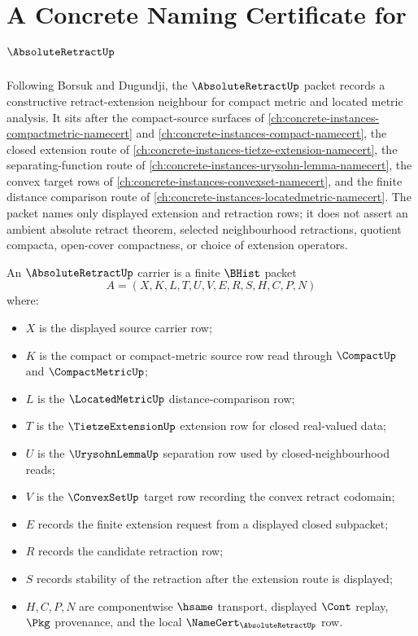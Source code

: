 \chapter{A Concrete Naming Certificate for $\AbsoluteRetractUp$}
\label{ch:concrete-instances-absolute-retract-namecert}

Following Borsuk and Dugundji, the $\AbsoluteRetractUp$ packet records a constructive retract-extension neighbour for compact metric and located metric analysis. It sits after the compact-source surfaces of \autoref{ch:concrete-instances-compactmetric-namecert} and \autoref{ch:concrete-instances-compact-namecert}, the closed extension route of \autoref{ch:concrete-instances-tietze-extension-namecert}, the separating-function route of \autoref{ch:concrete-instances-urysohn-lemma-namecert}, the convex target rows of \autoref{ch:concrete-instances-convexset-namecert}, and the finite distance comparison route of \autoref{ch:concrete-instances-locatedmetric-namecert}. The packet names only displayed extension and retraction rows; it does not assert an ambient absolute retract theorem, selected neighbourhood retractions, quotient compacta, open-cover compactness, or choice of extension operators.

\begin{definition}\label{def:absolute-retract-carrier}
An $\AbsoluteRetractUp$ carrier is a finite $\BHist$ packet
$$
A=(X,K,L,T,U,V,E,R,S,H,C,P,N)
$$
where:
\begin{itemize}
\item $X$ is the displayed source carrier row;
\item $K$ is the compact or compact-metric source row read through $\CompactUp$ and $\CompactMetricUp$;
\item $L$ is the $\LocatedMetricUp$ distance-comparison row;
\item $T$ is the $\TietzeExtensionUp$ extension row for closed real-valued data;
\item $U$ is the $\UrysohnLemmaUp$ separation row used by closed-neighbourhood reads;
\item $V$ is the $\ConvexSetUp$ target row recording the convex retract codomain;
\item $E$ records the finite extension request from a displayed closed subpacket;
\item $R$ records the candidate retraction row;
\item $S$ records stability of the retraction after the extension route is displayed;
\item $H,C,P,N$ are componentwise $\hsame$ transport, displayed $\Cont$ replay, $\Pkg$ provenance, and the local $\NameCert_{\AbsoluteRetractUp}$ row.
\end{itemize}
\end{definition}

